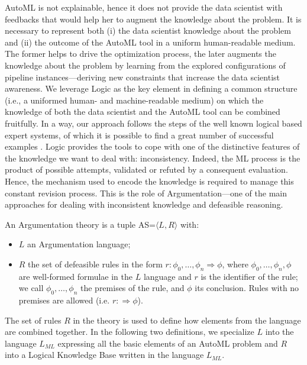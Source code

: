 AutoML is not explainable, hence it does not provide the data scientist with feedbacks that would help her to augment the knowledge about the problem.
It is necessary to represent both (i) the data scientist knowledge about the problem and (ii) the outcome of the AutoML tool in a uniform human-readable medium.
The former helps to drive the optimization process,
the later augments the knowledge about the problem by learning from the explored configurations of pipeline instances---deriving new constraints that increase the data scientist awareness.
We leverage Logic as the key element in defining a common structure (i.e., a uniformed human- and machine-readable medium) on which the knowledge of both the data scientist and the AutoML tool can be combined fruitfully.
In a way, our approach follows the steps of the well known logical based expert systems, of which it is possible to find a great number of successful examples \cite{tan17es}.
Logic provides the tools to cope with one of the distinctive features of the knowledge we want to deal with: inconsistency. Indeed, the ML process is the product of possible attempts, validated or refuted by a consequent evaluation. Hence, the mechanism used to encode the knowledge is required to manage this constant revision process.
This is the role of Argumentation---one of the main approaches for dealing with inconsistent knowledge and defeasible reasoning. 

\begin{definition}\label{system}
An Argumentation theory is a tuple AS=$\langle L, R \rangle$ with:
\begin{itemize}
    \item $L$ an Argumentation language;
    \item $R$ the set of defeasible rules in the form $r : \phi_0,\ldots, \phi_n \Rightarrow \phi$, where $\phi_0,\ldots, \phi_n,\phi$ are well-formed formulae in the $L$ language and $r$ is the identifier of the rule; we call $\phi_0,\ldots, \phi_n$ the premises of the rule, and $\phi$ its conclusion.
    Rules with no premises are allowed (i.e. $r : \Rightarrow \phi$).
\end{itemize}
\end{definition}

The set of rules $R$ in the theory is used to define how elements from the language are combined together.
In the following two definitions, we specialize $L$ into the language $L_{ML}$ expressing all the basic elements of an AutoML problem and $R$ into a Logical Knowledge Base written in the language $L_{ML}$.

